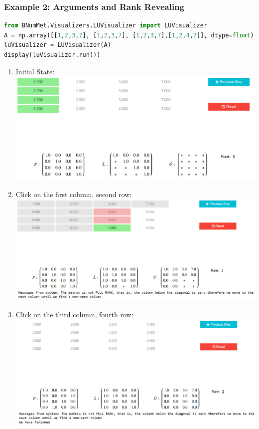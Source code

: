 \subsubsection{Example 2: Arguments and Rank Revealing}{
\begin{lstlisting}[language=Python]
from BNumMet.Visualizers.LUVisualizer import LUVisualizer
A = np.array([[1,2,3,7], [1,2,3,7], [1,2,3,7],[1,2,4,7]], dtype=float)
luVisualizer = LUVisualizer(A)
display(luVisualizer.run())
\end{lstlisting}

\begin{enumerate}
\item Initial State: \\
\includegraphics[scale=0.45]{Include/Images/Thesis/Documentation/Visualizers/LUVisualizer/Example 2/Example 2 - 00 - Initial State.png}

\item Click on the first column, second row: \\
\includegraphics[scale=0.4]{Include/Images/Thesis/Documentation/Visualizers/LUVisualizer/Example 2/Example 2 - 01 - Click first column, second row.png}

\item Click on the third column, fourth row: \\
\includegraphics[scale=0.45]{Include/Images/Thesis/Documentation/Visualizers/LUVisualizer/Example 2/Example 2 - 02 - Click thirdcolumn, fourth row.png}
\end{enumerate}
}


